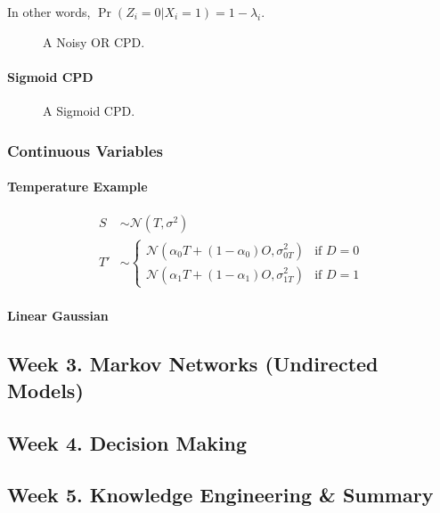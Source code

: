 \documentclass[12pt]{article}
\begin{document}
In other words, $\Pr(Z_i=0 | X_i=1) = 1 - \lambda_i$.

\begin{figure}[H]
\centering
\caption{A Noisy OR CPD.}
\label{fig:noisy_or_cpd}
\end{figure}


\paragraph{Sigmoid CPD}


\begin{figure}[H]
\centering
\caption{A Sigmoid CPD.}
\label{fig:sigmoid_cpd}
\end{figure}


\subsubsection{Continuous Variables}

\paragraph{Temperature Example}
\begin{align*}
  S & \sim \mathcal{N}(T, \sigma^2) \\
  T' & \sim 
    \begin{cases}
      \mathcal{N}(\alpha_0 T + (1-\alpha_0)O, \sigma_{0T}^2) & \text{if } D = 0 \\
      \mathcal{N}(\alpha_1 T + (1-\alpha_1)O, \sigma_{1T}^2) & \text{if } D = 1
    \end{cases}
\end{align*}

\paragraph{Linear Gaussian}


\subsection{Week 3. Markov Networks (Undirected Models)}


\subsection{Week 4. Decision Making}


\subsection{Week 5. Knowledge Engineering \& Summary}
\end{document}
